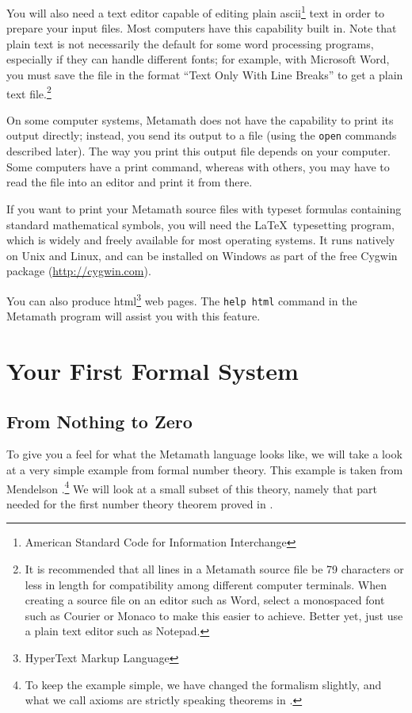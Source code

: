 You will also need a text editor capable of editing plain
{\sc ascii}\footnote{American Standard Code for Information Interchange} text
in order to prepare your input files.  Most computers
have this capability built in.  Note that plain text is not necessarily the
default for some word processing programs, especially if
they can handle different fonts; for example, with Microsoft Word, you must save the file in the format ``Text Only With Line
Breaks'' to get a plain text file.\footnote{It is
recommended that all lines in a Metamath source file be 79 characters or less
in length for compatibility among different computer terminals.  When creating
a source file on an editor such as Word, select a monospaced
font such as Courier or
Monaco to make this easier to achieve.  Better yet,
just use a plain text editor such as Notepad.}

On some computer systems, Metamath does not have the capability to print
its output directly; instead, you send its output to a file (using the
\texttt{open} commands described later).  The way you print this output
file depends on your computer. Some computers have a
print command, whereas with others, you may have to read the file into
an editor and print it from there.

If you want to print your Metamath source files with typeset formulas
containing standard mathematical symbols, you will need the \LaTeX\
typesetting program, which is widely and freely
available for most operating systems.  It runs natively on Unix and
Linux, and can be installed on Windows as part of the free Cygwin
package (\url{http://cygwin.com}).

You can also produce {\sc html}\footnote{HyperText Markup Language}
web pages.  The {\tt help html} command in the Metamath program will
assist you with this feature.

\section{Your First Formal System}\label{start}
\subsection{From Nothing to Zero}\label{startf}

To give you a feel for what the Metamath language looks like,
we will take a look at a very simple example from formal number
theory.  This example is taken from
Mendelson \cite[p. 123]{Mendelson}.\footnote{To keep
the example simple, we have changed the formalism slightly, and what we call
axioms\index{axiom} are strictly speaking theorems\index{theorem} in
\cite{Mendelson}.}  We will look at a small subset of this theory, namely that
part needed for the first number theory theorem proved in \cite{Mendelson}.


